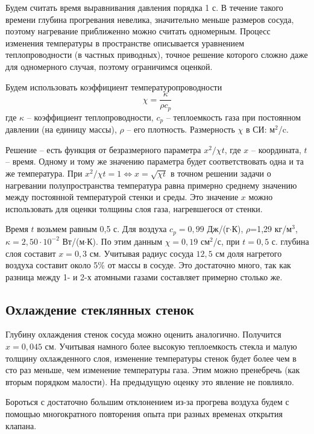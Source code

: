 \documentclass[a4paper,12pt]{report}
\begin{document}
    Будем считать время выравнивания давления порядка 1 с. В течение такого времени глубина прогревания невелика, значительно меньше размеров сосуда, поэтому нагревание приближенно можно считать одномерным. Процесс изменения температуры в пространстве описывается уравнением теплопроводности (в частных приводных), точное решение которого сложно даже для одномерного случая, поэтому ограничимся оценкой.

    Будем использовать коэффициент температуропроводности
    \begin{equation*}
        \chi=\frac{\kappa}{\rho c_p}
    \end{equation*}
    где $\kappa$ -- коэффициент теплопроводности, $c_p$ -- теплоемкость газа при постоянном давлении (на единицу массы), $\rho$ -- его плотность. Размерность $\chi$ в СИ: м$^2$/c.

    Решение -- есть функция от безразмерного параметра $x^2/\chi t$, где $x$ -- координата, $t$ -- время. Одному и тому же значению параметра будет соответствовать одна и та же температура. При $x^2/\chi t=1 \Leftrightarrow x=\sqrt{\chi t}$ в точном решении задачи о нагревании полупространства температура равна примерно среднему значению между постоянной температурой стенки и среды. Это значение $x$ можно использовать для оценки толщины слоя газа, нагревшегося от стенки.
    
    Время $t$ возьмем равным 0,5 с. Для воздуха $c_p=0,99$ Дж/(г$\cdot$К), $\rho$=1,29 кг/м$^3$, $\kappa=2,50\cdot10^{-2}$ Вт/(м$\cdot$К). По этим данным $\chi=0,19$ см$^2$/с, при $t=0,5$ с. глубина слоя составит $x=0,3$ см. Учитывая радиус сосуда $12,5$ см доля нагретого воздуха составит около 5\% от массы в сосуде. Это достаточно много, так как разница между 1- и 2-х атомными газами составляет примерно столько же.

    \subsection*{Охлаждение стеклянных стенок}
    Глубину охлаждения стенок сосуда можно оценить аналогично. Получится $x=0,045$ см. Учитывая намного более высокую теплоемкость стекла и малую толщину охлажденного слоя, изменение температуры стенок будет более чем в сто раз меньше, чем изменение температуры газа. Этим можно пренебречь (как вторым порядком малости). На предыдущую оценку это явление не повлияло.

    Бороться с достаточно большим отклонением из-за прогрева воздуха будем с помощью многократного повторения опыта при разных временах открытия клапана.
\end{document}

